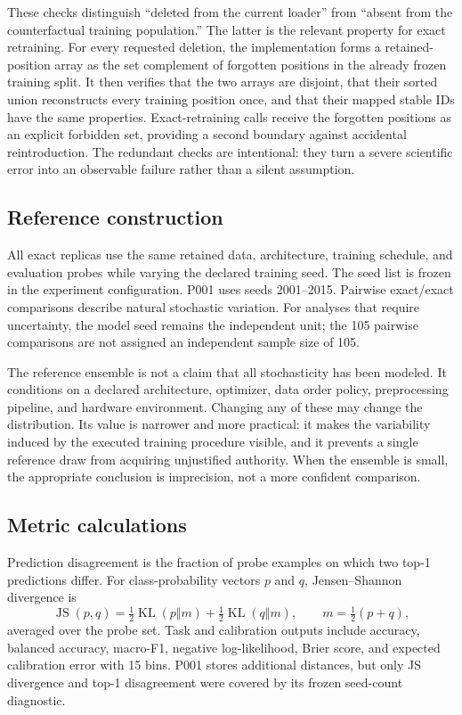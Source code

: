 These checks distinguish ``deleted from the current loader'' from ``absent from the
counterfactual training population.'' The latter is the relevant property for exact retraining.
For every requested deletion, the implementation forms a retained-position array as the set
complement of forgotten positions in the already frozen training split. It then verifies that
the two arrays are disjoint, that their sorted union reconstructs every training position once,
and that their mapped stable IDs have the same properties. Exact-retraining calls receive the
forgotten positions as an explicit forbidden set, providing a second boundary against accidental
reintroduction. The redundant checks are intentional: they turn a severe scientific error into
an observable failure rather than a silent assumption.

\subsection{Reference construction}
All exact replicas use the same retained data, architecture, training schedule, and
evaluation probes while varying the declared training seed. The seed list is frozen in the
experiment configuration. P001 uses seeds 2001--2015. Pairwise exact/exact comparisons
describe natural stochastic variation. For analyses that require uncertainty, the model
seed remains the independent unit; the 105 pairwise comparisons are not assigned an
independent sample size of 105.

The reference ensemble is not a claim that all stochasticity has been modeled. It conditions
on a declared architecture, optimizer, data order policy, preprocessing pipeline, and hardware
environment. Changing any of these may change the distribution. Its value is narrower and more
practical: it makes the variability induced by the executed training procedure visible, and it
prevents a single reference draw from acquiring unjustified authority. When the ensemble is
small, the appropriate conclusion is imprecision, not a more confident comparison.

\subsection{Metric calculations}
Prediction disagreement is the fraction of probe examples on which two top-1 predictions
differ. For class-probability vectors $p$ and $q$, Jensen--Shannon divergence is
\begin{equation}
\operatorname{JS}(p,q)=\tfrac12\operatorname{KL}(p\Vert m)
+\tfrac12\operatorname{KL}(q\Vert m),\qquad m=\tfrac12(p+q),
\end{equation}
averaged over the probe set. Task and calibration outputs include accuracy, balanced
accuracy, macro-F1, negative log-likelihood, Brier score, and expected calibration error
with 15 bins. P001 stores additional distances, but only JS divergence and top-1
disagreement were covered by its frozen seed-count diagnostic.

